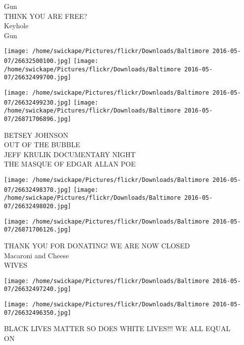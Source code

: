 \documentclass[10pt,letterpaper]{article}
\begin{document}
Gun\\
THINK YOU ARE FREE?\\
Keyhole\\
Gun
\pagebreak

\texttt{[image: /home/swickape/Pictures/flickr/Downloads/Baltimore 2016-05-07/26632500100.jpg]}
\texttt{[image: /home/swickape/Pictures/flickr/Downloads/Baltimore 2016-05-07/26632499700.jpg]}

\texttt{[image: /home/swickape/Pictures/flickr/Downloads/Baltimore 2016-05-07/26632499230.jpg]}
\texttt{[image: /home/swickape/Pictures/flickr/Downloads/Baltimore 2016-05-07/26871706896.jpg]}

BETSEY JOHNSON\\
OUT OF THE BUBBLE\\
JEFF KRULIK DOCUMENTARY NIGHT\\
THE MASQUE OF EDGAR ALLAN POE
\pagebreak

\texttt{[image: /home/swickape/Pictures/flickr/Downloads/Baltimore 2016-05-07/26632498370.jpg]}
\texttt{[image: /home/swickape/Pictures/flickr/Downloads/Baltimore 2016-05-07/26632498020.jpg]}

\vspace{0.25in}
\texttt{[image: /home/swickape/Pictures/flickr/Downloads/Baltimore 2016-05-07/26871706126.jpg]}

THANK YOU FOR DONATING!  WE ARE NOW CLOSED\\
Macaroni and Cheese\\
WIVES
\pagebreak

\texttt{[image: /home/swickape/Pictures/flickr/Downloads/Baltimore 2016-05-07/26632497240.jpg]}

\vspace{0.25in}
\texttt{[image: /home/swickape/Pictures/flickr/Downloads/Baltimore 2016-05-07/26632496350.jpg]}

BLACK LIVES MATTER SO DOES WHITE LIVES!!! WE ALL EQUAL\\
ON
\pagebreak
\end{document}
